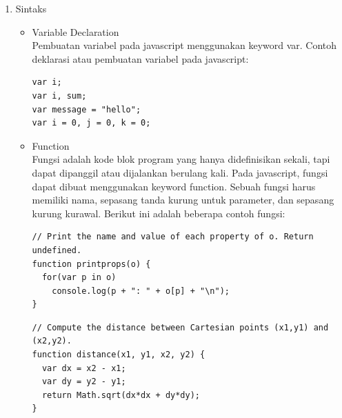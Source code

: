 \begin{enumerate}
\item Sintaks
\begin{itemize}
\item Variable Declaration \\
Pembuatan variabel pada javascript menggunakan keyword var. Contoh deklarasi atau pembuatan variabel pada javascript:
\begin{verbatim}
var i;
var i, sum;
var message = "hello";
var i = 0, j = 0, k = 0;
\end{verbatim}


\item Function \\
Fungsi adalah kode blok program yang hanya didefinisikan sekali, tapi dapat dipanggil atau 
dijalankan berulang kali. Pada javascript, fungsi dapat dibuat menggunakan keyword function. 
Sebuah fungsi harus memiliki nama, sepasang tanda kurung untuk parameter, dan sepasang kurung kurawal. 
Berikut ini adalah beberapa contoh fungsi:
\begin{verbatim}
// Print the name and value of each property of o. Return undefined.
function printprops(o) {
  for(var p in o)
    console.log(p + ": " + o[p] + "\n");
}
\end{verbatim}
\begin{verbatim}
// Compute the distance between Cartesian points (x1,y1) and (x2,y2).
function distance(x1, y1, x2, y2) {
  var dx = x2 - x1;
  var dy = y2 - y1;
  return Math.sqrt(dx*dx + dy*dy);
}
\end{verbatim}
\end{itemize}
\end{enumerate}
